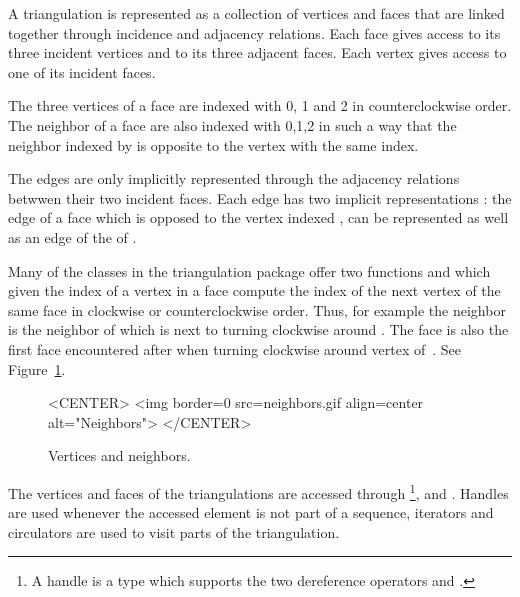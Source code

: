 A triangulation is represented as a collection of vertices and faces that
are linked together through incidence and adjacency relations.
Each face gives access to its three incident vertices and to
its 
three adjacent faces. Each vertex gives access to one of its  incident
faces. 

The three vertices of a face are indexed with 0, 1 and 2
in counterclockwise order. The neighbor of a face are also 
indexed with 0,1,2 in such a way that the neighbor indexed by 
is opposite to the vertex with the same index.

The edges  are only implicitly represented
through the adjacency relations betwwen their  two incident
faces. Each edge has two implicit representations : the edge
of a face   which is opposed to the vertex indexed ,
can be represented as well as an edge of the  of 
.


Many of the classes in the triangulation package
offer  two functions  and 
which given the index of a vertex in a face
compute the index of the next vertex  of the same face
in clockwise
or counterclockwise order.
 Thus, for example the neighbor 
 is
 the
neighbor of   which is next to  turning clockwise
around . The face 
is also the first face encountered after  when
turning clockwise around vertex 
of~. See Figure~\ref{I1_Fig_neighbors}.



 \begin{figure}
\begin{ccTexOnly}
    \begin{center}
     
    \end{center}
\end{ccTexOnly} 
    \caption{Vertices and neighbors.
    \label{I1_Fig_neighbors}}
  \begin{ccHtmlOnly}
<CENTER>
<img border=0 src=neighbors.gif align=center alt="Neighbors">
</CENTER>
\end{ccHtmlOnly} 
\end{figure}


The vertices and faces of the triangulations are accessed through 
\footnote{ A handle is a type which supports the two
dereference operators  and .}, 
 and . 
Handles are used whenever the accessed element 
is not part of a sequence,
iterators and circulators are used
to visit parts of the triangulation.

